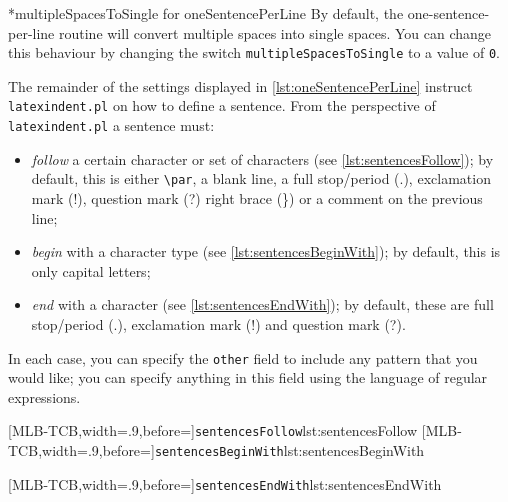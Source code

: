 \documentclass[10pt]{article}
\begin{document}
 *{multipleSpacesToSingle for oneSentencePerLine} By default, the
 one-sentence-per-line routine will convert multiple spaces into single spaces. You can
 change this behaviour by changing the switch \texttt{multipleSpacesToSingle} to a value
 of \texttt{0}.

 The remainder of the settings displayed in \vref{lst:oneSentencePerLine} instruct
 \texttt{latexindent.pl} on how to define a sentence. From the perspective of
 \texttt{latexindent.pl} a sentence must:   
 \begin{itemize}
  \item \emph{follow} a certain character or set of characters (see
        \cref{lst:sentencesFollow}); by default, this is either \lstinline!\par!, a
        blank line, a full stop/period (.), exclamation mark (!), question mark (?) right brace
        (\}) or a comment on the previous line;
  \item \emph{begin} with a character type (see \cref{lst:sentencesBeginWith}); by
        default, this is only capital letters;
  \item \emph{end} with a character (see \cref{lst:sentencesEndWith}); by
        default, these are full stop/period (.), exclamation mark (!) and question mark (?).
 \end{itemize}
 In each case, you can specify the \texttt{other} field to include any pattern that you
 would like; you can specify anything in this field using the language of regular
 expressions.  

 \begin{cmhtcbraster}[raster columns=2,
   raster left skip=-3.5cm,
   raster right skip=-2cm,
   raster column skip=.06\linewidth]
  [MLB-TCB,width=.9\linewidth,before=\centering]{\texttt{sentencesFollow}}{lst:sentencesFollow}
  [MLB-TCB,width=.9\linewidth,before=\centering]{\texttt{sentencesBeginWith}}{lst:sentencesBeginWith}
 \end{cmhtcbraster}

 [MLB-TCB,width=.9\linewidth,before=\centering]{\texttt{sentencesEndWith}}{lst:sentencesEndWith}
\end{document}
